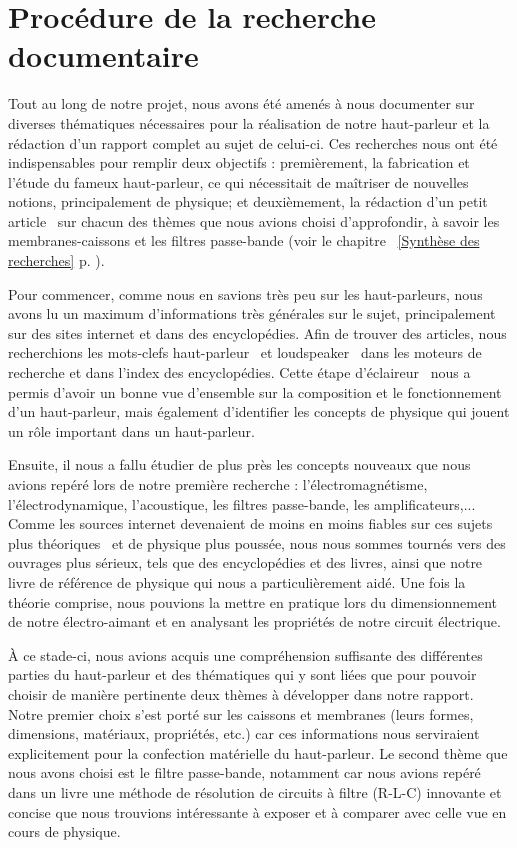 \section{Procédure de la recherche documentaire} 
\label{sec:app/demarche}

Tout au long de notre projet, nous avons été amenés à nous documenter sur diverses thématiques nécessaires pour la réalisation de notre haut-parleur et la rédaction d'un rapport complet au sujet de celui-ci.
Ces recherches nous ont été indispensables pour remplir deux objectifs : premièrement, la fabrication et l'étude du fameux haut-parleur, ce qui nécessitait de maîtriser de nouvelles notions, principalement de physique; et deuxièmement, la rédaction d'un petit \og article \fg\ sur chacun des thèmes que nous avions choisi d'approfondir, à savoir les membranes-caissons et les filtres passe-bande (voir le chapitre ~\ref{Synthèse des recherches} p. \pageref{Synthèse des recherches}).
\newline

Pour commencer, comme nous en savions très peu sur les haut-parleurs, nous avons lu un maximum d’informations très générales sur le sujet, principalement sur des sites internet et dans des encyclopédies. Afin de trouver des articles, nous recherchions les mots-clefs \og haut-parleur \fg\ et \og loudspeaker \fg\ dans les moteurs de recherche et dans l'index des encyclopédies. 
Cette étape \og d'éclaireur \fg\ nous a permis d'avoir un bonne vue d’ensemble sur la composition et le fonctionnement d’un haut-parleur, mais également d'identifier les concepts de physique qui jouent un rôle important dans un haut-parleur.  

Ensuite, il nous a fallu étudier de plus près les concepts nouveaux que nous avions repéré lors de notre première recherche : l'électromagnétisme, l'électrodynamique, l’acoustique, les filtres passe-bande, les amplificateurs,... Comme les sources internet devenaient de moins en moins fiables sur ces sujets plus \og théoriques \fg\ et de physique plus poussée, nous nous sommes tournés vers des ouvrages plus sérieux, tels que des encyclopédies et des livres, ainsi que notre livre de référence de physique \cite{Young} qui nous a particulièrement aidé. Une fois la théorie comprise, nous pouvions la mettre en pratique lors du dimensionnement de notre électro-aimant et en analysant les propriétés de notre circuit électrique. 
\newline

À ce stade-ci, nous avions acquis une compréhension suffisante des différentes parties du haut-parleur et des thématiques qui y sont liées que pour pouvoir choisir de manière pertinente deux thèmes à développer dans notre rapport. Notre premier choix s'est  porté sur les caissons et membranes (leurs formes, dimensions, matériaux, propriétés, etc.) car ces informations nous serviraient explicitement pour la confection matérielle du haut-parleur. Le second thème que nous avons choisi est le filtre passe-bande, notamment car nous avions repéré dans un livre une méthode de résolution de circuits à filtre (R-L-C) innovante et concise que nous trouvions intéressante à exposer et à comparer avec celle vue en cours de physique. 


